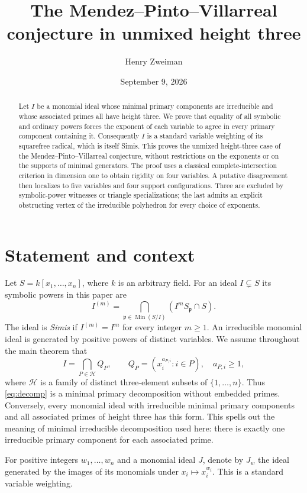 \documentclass[11pt]{article}
\title{The Mendez--Pinto--Villarreal conjecture in unmixed height three}
\author{Henry Zweiman}
\date{September 9, 2026}
\newcommand{\Min}{\operatorname{Min}}
\begin{document}
\maketitle
\begin{abstract}
Let $I$ be a monomial ideal whose minimal primary components are
irreducible and whose associated primes all have height three.
We prove that equality of all symbolic and ordinary powers forces the
exponent of each variable to agree in every primary component containing
it. Consequently $I$ is a standard variable weighting of its squarefree
radical, which is itself Simis. This proves the unmixed height-three
case of the Mendez--Pinto--Villarreal conjecture, without restrictions
on the exponents or on the supports of minimal generators.
The proof uses a classical complete-intersection criterion in dimension
one to obtain rigidity on four variables. A putative disagreement then
localizes to five variables and four support configurations. Three are
excluded by symbolic-power witnesses or triangle specializations;
the last admits an explicit obstructing vertex of the irreducible
polyhedron for every choice of exponents.
\end{abstract}

\section{Statement and context}
Let $S=k[x_1,\ldots,x_n]$, where $k$ is an arbitrary field. For an ideal
$I\subsetneq S$ its symbolic powers in this paper are
\[
 I^{(m)}=\bigcap_{\mathfrak p\in\Min(S/I)}(I^mS_{\mathfrak p}\cap S).
\]
The ideal is \emph{Simis} if $I^{(m)}=I^m$ for every integer $m\geq1$.
An irreducible monomial ideal is generated by positive powers of
distinct variables. We assume throughout the main theorem that
\begin{equation}\label{eq:decomp}
 I=\bigcap_{P\in\mathcal H}Q_P,
 \qquad Q_P=(x_i^{a_{P,i}}:i\in P),\quad a_{P,i}\geq1,
\end{equation}
where $\mathcal H$ is a family of distinct three-element subsets of
$\{1,\ldots,n\}$. Thus \eqref{eq:decomp} is a minimal primary
decomposition without embedded primes. Conversely, every monomial
ideal with irreducible minimal primary components and all associated
primes of height three has this form. This spells out the meaning of
minimal irreducible decomposition used here: there is exactly one
irreducible primary component for each associated prime.

For positive integers $w_1,\ldots,w_n$ and a monomial ideal $J$, denote
by $J_w$ the ideal generated by the images of its monomials under
$x_i\mapsto x_i^{w_i}$. This is a standard variable weighting.
\end{document}
